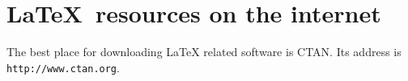 \documentclass{article}
\begin{document}
\section{\textsf{\LaTeX\ resources on the internet}}
The best place for downloading LaTeX related software is CTAN.
Its address is \texttt{http://www.ctan.org}.
\end{document}
